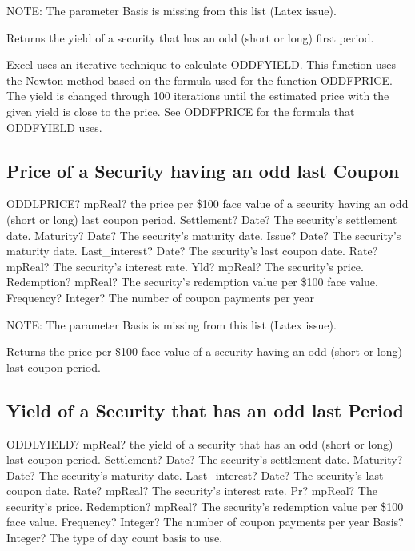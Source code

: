 \vspace{0.3cm}
NOTE: The parameter Basis is missing from this list (Latex issue).

Returns the yield of a security that has an odd (short or long) first period.

Excel uses an iterative technique to calculate ODDFYIELD. This function uses the Newton method based on the formula used for the function ODDFPRICE. The yield is changed through 100 iterations until the estimated price with the given yield is close to the price. See ODDFPRICE for the formula that ODDFYIELD uses. 




\subsection{Price of a Security having an odd last Coupon}

\begin{mpFunctionsExtract}
	\mpWorksheetFunctionEightNotImplemented
	{ODDLPRICE? mpReal? the price per \$100 face value of a security having an odd (short or long) last coupon period.}
	{Settlement? Date?  The security's settlement date.}
	{Maturity? Date? The security's maturity date.}
	{Issue? Date?  The security's maturity date.}
	{Last\_interest? Date? The security's last coupon date.}
	{Rate? mpReal? The security's interest rate.}
	{Yld? mpReal? The security's price.}
	{Redemption? mpReal? The security's redemption value per \$100 face value.}
	{Frequency? Integer? The number of coupon payments per year}
\end{mpFunctionsExtract}

\vspace{0.3cm}
NOTE: The parameter Basis is missing from this list (Latex issue).

Returns the price per \$100 face value of a security having an odd (short or long) last coupon period.





\subsection{Yield of a Security that has an odd last Period}

\begin{mpFunctionsExtract}
	\mpWorksheetFunctionEightNotImplemented
	{ODDLYIELD? mpReal? the yield of a security that has an odd (short or long) last coupon period.}
	{Settlement? Date?  The security's settlement date.}
	{Maturity? Date? The security's maturity date.}
	{Last\_interest? Date? The security's last coupon date.}
	{Rate? mpReal? The security's interest rate.}
	{Pr? mpReal? The security's price.}
	{Redemption? mpReal? The security's redemption value per \$100 face value.}
	{Frequency? Integer? The number of coupon payments per year}
	{Basis? Integer? The type of day count basis to use.}
\end{mpFunctionsExtract}

